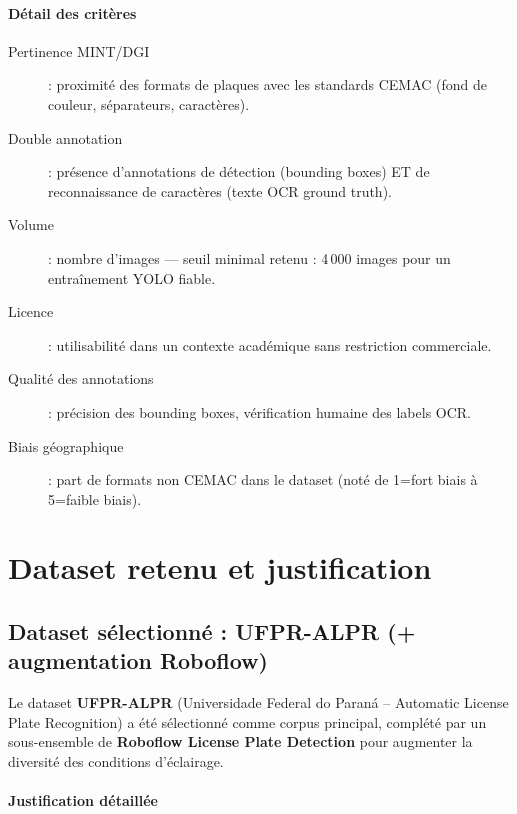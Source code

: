 \documentclass[12pt,a4paper]{article}
\begin{document}
\paragraph{D\'{e}tail des crit\`{e}res}
\begin{description}
  \item[Pertinence MINT/DGI] : proximit\'{e} des formats de plaques avec les
        standards CEMAC (fond de couleur, s\'{e}parateurs, caract\`{e}res).
  \item[Double annotation] : pr\'{e}sence d'annotations de d\'{e}tection
        (bounding boxes) ET de reconnaissance de caract\`{e}res (texte OCR ground truth).
  \item[Volume] : nombre d'images --- seuil minimal retenu : 4\,000 images pour
        un entra\^{i}nement YOLO fiable.
  \item[Licence] : utilisabilit\'{e} dans un contexte acad\'{e}mique sans
        restriction commerciale.
  \item[Qualit\'{e} des annotations] : pr\'{e}cision des bounding boxes,
        v\'{e}rification humaine des labels OCR.
  \item[Biais g\'{e}ographique] : part de formats non CEMAC dans le dataset
        (not\'{e} de 1=fort biais \`{a} 5=faible biais).
\end{description}

\section{Dataset retenu et justification}
\label{sec:dsd:retenu}

\subsection*{Dataset s\'{e}lectionn\'{e} : UFPR-ALPR (+ augmentation Roboflow)}

Le dataset \textbf{UFPR-ALPR} (Universidade Federal do Paran\'{a} -- Automatic
License Plate Recognition) a \'{e}t\'{e} s\'{e}lectionn\'{e} comme corpus
principal, compl\'{e}t\'{e} par un sous-ensemble de \textbf{Roboflow License
Plate Detection} pour augmenter la diversit\'{e} des conditions d'\'{e}clairage.

\paragraph{Justification d\'{e}taill\'{e}e}
\end{document}
